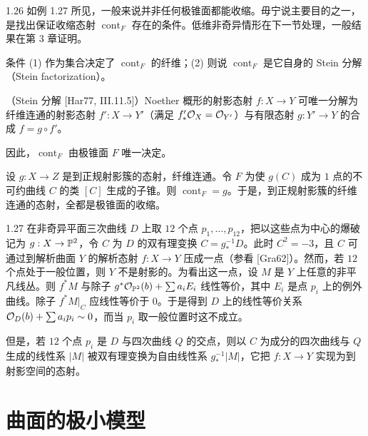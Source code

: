 
\begin{remark}{1.26}
如例 1.27 所见，一般来说并非任何极锥面都能收缩。毋宁说主要目的之一，是找出保证收缩态射 $\operatorname{cont}_F$ 存在的条件。低维非奇异情形在下一节处理，一般结果在第 3 章证明。

条件 (1) 作为集合决定了 $\operatorname{cont}_F$ 的纤维；(2) 则说 $\operatorname{cont}_F$ 是它自身的 Stein 分解（Stein factorization）。

（Stein 分解 [Har77, III.11.5]）Noether 概形的射影态射 $f:X\to Y$ 可唯一分解为纤维连通的射影态射 $f':X\to Y'$（满足 $f'_*\mathcal{O}_X=\mathcal{O}_{Y'}$）与有限态射 $g:Y'\to Y$ 的合成 $f=g\circ f'$。

因此，$\operatorname{cont}_F$ 由极锥面 $F$ 唯一决定。

设 $g:X\to Z$ 是到正规射影簇的态射，纤维连通。令 $F$ 为使 $g(C)$ 成为 $1$ 点的不可约曲线 $C$ 的类 $[C]$ 生成的子锥。则 $\operatorname{cont}_F=g$。于是，到正规射影簇的纤维连通的态射，全都是极锥面的收缩。
\end{remark}

\begin{example}[{[Zar62]}]{1.27}
在非奇异平面三次曲线 $D$ 上取 $12$ 个点 $p_1,\dots,p_{12}$，把以这些点为中心的爆破记为 $g:X\to\mathbb{P}^2$，令 $C$ 为 $D$ 的双有理变换 $C=g^{-1}_*D$。此时 $C^2=-3$，且 $C$ 可通过到解析曲面 $Y$ 的解析态射 $f:X\to Y$ 压成一点（参看 [Gra62]）。然而，若 $12$ 个点处于一般位置，则 $Y$ 不是射影的。为看出这一点，设 $M$ 是 $Y$ 上任意的非平凡线丛。则 $f^*M$ 与除子 $g^*\mathcal{O}_{\mathbb{P}^2}(b)+\sum a_iE_i$ 线性等价，其中 $E_i$ 是点 $p_i$ 上的例外曲线。除子 $f^*M|_C$ 应线性等价于 $0$。于是得到 $D$ 上的线性等价关系 $\mathcal{O}_D(b)+\sum a_ip_i\sim0$，而当 $p_i$ 取一般位置时这不成立。

但是，若 $12$ 个点 $p_i$ 是 $D$ 与四次曲线 $Q$ 的交点，则以 $C$ 为成分的四次曲线与 $Q$ 生成的线性系 $|M|$ 被双有理变换为自由线性系 $g^{-1}_*|M|$，它把 $f:X\to Y$ 实现为到射影空间的态射。
\end{example}

\section{曲面的极小模型}


